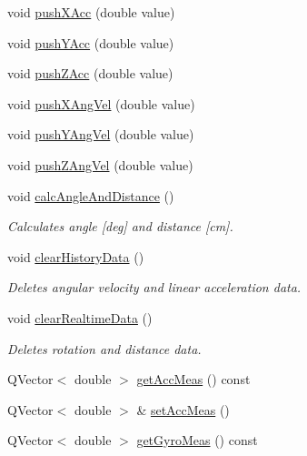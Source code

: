 \begin{DoxyCompactItemize}
\item 
void \mbox{\hyperlink{class_measurement_handler_a73435da23551d54e3db30467a0d7d82a}{push\+X\+Acc}} (double value)
\item 
void \mbox{\hyperlink{class_measurement_handler_a43008204cdec1e632d2da7d76b6351af}{push\+Y\+Acc}} (double value)
\item 
void \mbox{\hyperlink{class_measurement_handler_a6fea470ec1ca66864bf7f416dc878639}{push\+Z\+Acc}} (double value)
\item 
void \mbox{\hyperlink{class_measurement_handler_ad0cd4fa68261258a586ae193be1055ba}{push\+X\+Ang\+Vel}} (double value)
\item 
void \mbox{\hyperlink{class_measurement_handler_a51a85f65ef2ca40ad069d66d3a770a57}{push\+Y\+Ang\+Vel}} (double value)
\item 
void \mbox{\hyperlink{class_measurement_handler_a5155e86de3d5e138a3f510cbe9cc3932}{push\+Z\+Ang\+Vel}} (double value)
\item 
void \mbox{\hyperlink{class_measurement_handler_a1a88ac326f78ba4ee92f4ac16cf3d2dd}{calc\+Angle\+And\+Distance}} ()
\begin{DoxyCompactList}\small\item\em Calculates angle \mbox{[}deg\mbox{]} and distance \mbox{[}cm\mbox{]}. \end{DoxyCompactList}\item 
void \mbox{\hyperlink{class_measurement_handler_a4287d2123c6307d6d91790efe03f57a2}{clear\+History\+Data}} ()
\begin{DoxyCompactList}\small\item\em Deletes angular velocity and linear acceleration data. \end{DoxyCompactList}\item 
void \mbox{\hyperlink{class_measurement_handler_a97180ca03e2cbf6735eae197493cb7e9}{clear\+Realtime\+Data}} ()
\begin{DoxyCompactList}\small\item\em Deletes rotation and distance data. \end{DoxyCompactList}\item 
Q\+Vector$<$ double $>$ \mbox{\hyperlink{class_measurement_handler_a16cda730675bd1c0523327c6fd6a1669}{get\+Acc\+Meas}} () const
\item 
Q\+Vector$<$ double $>$ \& \mbox{\hyperlink{class_measurement_handler_ab31bf9f532b402898b3df7f27301f4c1}{set\+Acc\+Meas}} ()
\item 
Q\+Vector$<$ double $>$ \mbox{\hyperlink{class_measurement_handler_a80a29ba6bdd4aff53041f4c7f6ae90bd}{get\+Gyro\+Meas}} () const

\end{DoxyCompactItemize}
